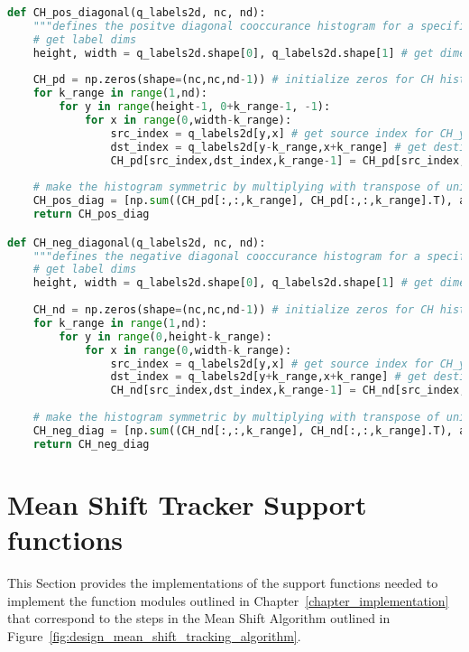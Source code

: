 \begin{lstlisting}[language=Python, caption={Additional functions for Co-occurrence Histogram Detection}, captionpos=b, label={lst:supportCH}]
def CH_pos_diagonal(q_labels2d, nc, nd):
    """defines the positve diagonal cooccurance histogram for a specifica template according to quantized colourspace labels"""
    # get label dims
    height, width = q_labels2d.shape[0], q_labels2d.shape[1] # get dimensions
    
    CH_pd = np.zeros(shape=(nc,nc,nd-1)) # initialize zeros for CH histogram according to quantizations size
    for k_range in range(1,nd):
        for y in range(height-1, 0+k_range-1, -1):
            for x in range(0,width-k_range):
                src_index = q_labels2d[y,x] # get source index for CH_y at (y,x)
                dst_index = q_labels2d[y-k_range,x+k_range] # get destincation index for CH_y at (y+k,x)
                CH_pd[src_index,dst_index,k_range-1] = CH_pd[src_index,dst_index,k_range-1] + 1 # update histogram count in bin (src_index,dst_index)
    
    # make the histogram symmetric by multiplying with transpose of unidirectional cooccurance histogram
    CH_pos_diag = [np.sum((CH_pd[:,:,k_range], CH_pd[:,:,k_range].T), axis=0) for k_range in range(0,nd-1)]
    return CH_pos_diag

def CH_neg_diagonal(q_labels2d, nc, nd):
    """defines the negative diagonal cooccurance histogram for a specific template according to quantized colourspace labels"""
    # get label dims
    height, width = q_labels2d.shape[0], q_labels2d.shape[1] # get dimensions
        
    CH_nd = np.zeros(shape=(nc,nc,nd-1)) # initialize zeros for CH histogram according to quantizations size
    for k_range in range(1,nd):
        for y in range(0,height-k_range):
            for x in range(0,width-k_range):
                src_index = q_labels2d[y,x] # get source index for CH_y at (y,x)
                dst_index = q_labels2d[y+k_range,x+k_range] # get destincation index for CH_y at (y+k,x)
                CH_nd[src_index,dst_index,k_range-1] = CH_nd[src_index,dst_index,k_range-1] + 1 # update histogram count in bin (src_index,dst_index)
    
    # make the histogram symmetric by multiplying with transpose of unidirectional cooccurance histogram
    CH_neg_diag = [np.sum((CH_nd[:,:,k_range], CH_nd[:,:,k_range].T), axis=0) for k_range in range(0,nd-1)]
    return CH_neg_diag  

\end{lstlisting}

\section{Mean Shift Tracker Support functions}\label{supportMS}
This Section provides the implementations of the support functions needed to
implement the function modules outlined in Chapter~\ref{chapter_implementation}
that correspond to the steps in the Mean Shift Algorithm outlined in
Figure~\ref{fig:design_mean_shift_tracking_algorithm}.

